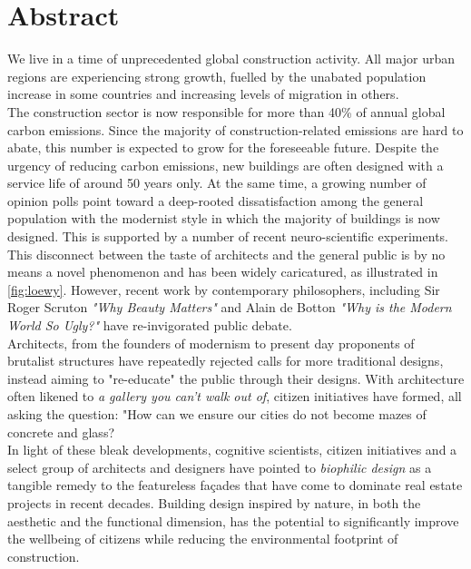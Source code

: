 \documentclass[a4paper]{article}
\begin{document}
\tableofcontents

\clearpage
\section{Abstract}
\label{sec:abstract}

We live in a time of unprecedented global construction activity. All major urban regions are experiencing strong growth, fuelled by the unabated population increase in some countries and increasing levels of migration in others. \\

The construction sector is now responsible for more than 40\% of annual global carbon emissions. Since the majority of construction-related emissions are hard to abate, this number is expected to grow for the foreseeable future. Despite the urgency of reducing carbon emissions, new buildings are often designed with a service life of around 50 years only. At the same time, a growing number of opinion polls point toward a deep-rooted dissatisfaction among the general population with the modernist style in which the majority of buildings is now designed. This is supported by a number of recent neuro-scientific experiments. \\

This disconnect between the taste of architects and the general public is by no means a novel phenomenon and has been widely caricatured, as illustrated in \cref{fig:loewy}. However, recent work by contemporary philosophers, including Sir Roger Scruton \textit{"Why Beauty Matters"} and Alain de Botton \textit{"Why is the Modern World So Ugly?"} have re-invigorated public debate. \\

Architects, from the founders of modernism to present day proponents of brutalist structures have repeatedly rejected calls for more traditional designs, instead aiming to "re-educate" the public through their designs. With architecture often likened to \textit{a gallery you can't walk out of}, citizen initiatives have formed, all asking the question: "How can we ensure our cities do not become mazes of concrete and glass? \\

In light of these bleak developments, cognitive scientists, citizen initiatives and a select group of architects and designers have pointed to \textit{biophilic design} as a tangible remedy to the featureless façades that have come to dominate real estate projects in recent decades. Building design inspired by nature, in both the aesthetic and the functional dimension, has the potential to significantly improve the wellbeing of citizens while reducing the environmental footprint of construction. \\
\end{document}
